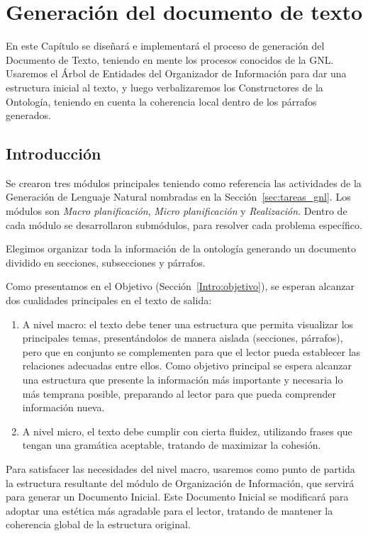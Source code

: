 \chapter{Generación del documento de texto}

En este Capítulo se diseñará e implementará el proceso de generación del Documento de Texto, teniendo en mente los procesos conocidos de la GNL. Usaremos el Árbol de Entidades del Organizador de Información para dar una estructura inicial al texto, y luego verbalizaremos los Constructores de la Ontología, teniendo en cuenta la coherencia local dentro de los párrafos generados.

\section{Introducción}
Se crearon tres módulos principales teniendo como referencia las actividades de la Generación de Lenguaje Natural nombradas en la Sección~\ref{sec:tareas_gnl}. Los módulos son \emph{Macro planificación}, \emph{Micro planificación} y \emph{Realización}. Dentro de cada módulo se desarrollaron submódulos, para resolver cada problema específico. 

Elegimos organizar toda la información de la ontología generando un documento dividido en secciones, subsecciones y párrafos. 

Como presentamos en el Objetivo (Sección~\ref{Intro:objetivo}), se esperan alcanzar dos cualidades principales en el texto de salida:
\begin{enumerate}
    \item A nivel macro: el texto debe tener una estructura que permita visualizar los principales temas, presentándolos de manera aislada (secciones, párrafos), pero que en conjunto se complementen para que el lector pueda establecer las relaciones adecuadas entre ellos. Como objetivo principal se espera alcanzar una estructura que presente la información más importante y necesaria lo más temprana posible, preparando al lector para que pueda comprender información nueva.
    \item A nivel micro, el texto debe cumplir con cierta fluidez, utilizando frases que tengan una gramática aceptable, tratando de maximizar la cohesión.
\end{enumerate}

Para satisfacer las necesidades del nivel macro, usaremos como punto de partida la estructura resultante del módulo de Organización de Información, que servirá para generar un Documento Inicial. Este Documento Inicial se modificará para adoptar una estética más agradable para el lector, tratando de mantener la coherencia global de la estructura original.

